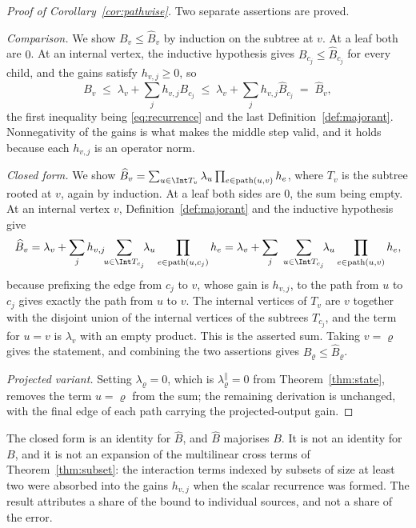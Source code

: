\begin{proof}[Proof of Corollary~\ref{cor:pathwise}]
Two separate assertions are proved.

\emph{Comparison.} We show $B_v\le\widehat B_v$ by induction on the subtree at $v$. At a
leaf both are $0$. At an internal vertex, the inductive hypothesis gives
$B_{c_j}\le\widehat B_{c_j}$ for every child, and the gains satisfy $h_{v,j}\ge0$, so
\[
 B_v
 \;\le\;\lambda_v+\sum_jh_{v,j}B_{c_j}
 \;\le\;\lambda_v+\sum_jh_{v,j}\widehat B_{c_j}
 \;=\;\widehat B_v,
\]
the first inequality being \eqref{eq:recurrence} and the last
Definition~\ref{def:majorant}. Nonnegativity of the gains is what makes the middle step
valid, and it holds because each $h_{v,j}$ is an operator norm.

\emph{Closed form.} We show
$\widehat B_v=\sum_{u\in\Int T_v}\lambda_u\prod_{e\in\mathrm{path}(u,v)}h_e$, where $T_v$
is the subtree rooted at $v$, again by induction. At a leaf both sides are $0$, the sum
being empty. At an internal vertex $v$, Definition~\ref{def:majorant} and the inductive
hypothesis give
\[
 \widehat B_v
 =\lambda_v+\sum_jh_{v,j}\!\!\sum_{u\in\Int T_{c_j}}\!\!\lambda_u
 \prod_{e\in\mathrm{path}(u,c_j)}h_e
 =\lambda_v+\sum_j\;\sum_{u\in\Int T_{c_j}}\!\!\lambda_u
 \prod_{e\in\mathrm{path}(u,v)}h_e ,
\]
because prefixing the edge from $c_j$ to $v$, whose gain is $h_{v,j}$, to the path from
$u$ to $c_j$ gives exactly the path from $u$ to $v$. The internal vertices of $T_v$ are
$v$ together with the disjoint union of the internal vertices of the subtrees $T_{c_j}$,
and the term for $u=v$ is $\lambda_v$ with an empty product. This is the asserted sum.
Taking $v=\varrho$ gives the statement, and combining the two assertions gives
$B_\varrho\le\widehat B_\varrho$.

\emph{Projected variant.} Setting $\lambda_\varrho=0$, which is
$\lambda^{\parallel}_\varrho=0$ from Theorem~\ref{thm:state}, removes the term $u=\varrho$
from the sum; the remaining derivation is unchanged, with the final edge of each path
carrying the projected-output gain.
\end{proof}

\begin{remark}
\label{rem:pathwisescope}
The closed form is an identity for $\widehat B$, and $\widehat B$ majorises $B$. It is not
an identity for $B$, and it is not an expansion of the multilinear cross terms of
Theorem~\ref{thm:subset}: the interaction terms indexed by subsets of size at least two
were absorbed into the gains $h_{v,j}$ when the scalar recurrence was formed. The result
attributes a share of the bound to individual sources, and not a share of the error.
\end{remark}

